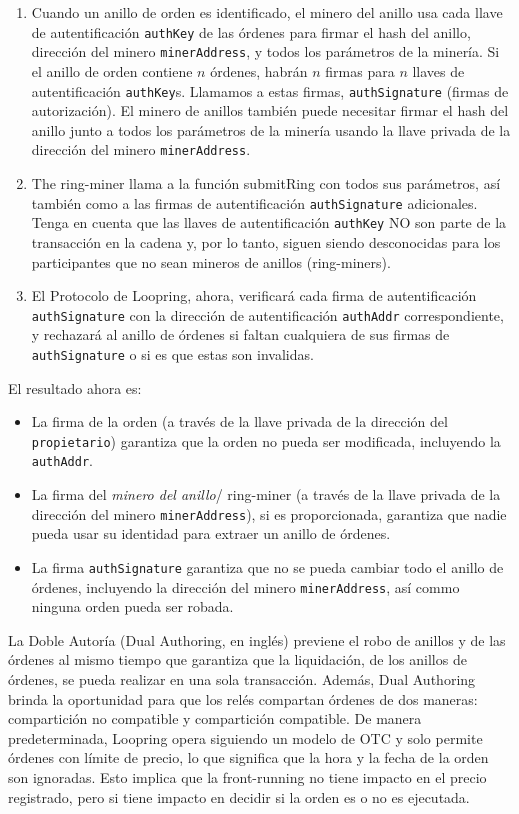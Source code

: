 \documentclass[UTF8,nofonts]{article}
\begin{document}
\begin{multicols}{2}
\begin{enumerate}
	\item Cuando un anillo de orden es identificado, el minero del anillo usa cada llave de autentificaci\'on \verb|authKey| de las \'ordenes para firmar el hash del anillo, direcci\'on del minero \verb|minerAddress|, y todos los par\'ametros de la miner\'ia. Si el anillo de orden contiene $n$ \'ordenes, habr\'an $n$ firmas para $n$ llaves de autentificaci\'on \verb|authKey|s. Llamamos a estas firmas, \verb|authSignature| (firmas de autorizaci\'on). El minero de anillos tambi\'en puede necesitar firmar el hash del anillo junto a todos los par\'ametros de la miner\'ia usando la llave privada de la direcci\'on del minero  \verb|minerAddress|.
	\item The ring-miner llama a la funci\'on submitRing con todos sus par\'ametros, as\'i tambi\'en como a las firmas de autentificaci\'on \verb|authSignature| adicionales. Tenga en cuenta que las llaves de autentificaci\'on \verb|authKey| NO son parte de la transacci\'on en la cadena y, por lo tanto, siguen siendo desconocidas para los participantes que no sean mineros de anillos (ring-miners).

	\item El Protocolo de Loopring, ahora, verificar\'a cada firma de autentificaci\'on \verb|authSignature| con la direcci\'on de autentificaci\'on \verb|authAddr| correspondiente, y rechazar\'a al anillo de \'ordenes si faltan cualquiera de sus firmas de \verb|authSignature| o si es que estas son invalidas.
 
\end{enumerate}
El resultado ahora es:
\begin{itemize}
    \item La firma de la orden (a trav\'es de la llave privada de la direcci\'on del \verb|propietario|) garantiza que la orden no pueda ser modificada, incluyendo la \verb|authAddr|.
    \item La firma del \textit{minero del anillo}/ ring-miner (a trav\'es de la llave privada de la direcci\'on del minero \verb|minerAddress|), si es proporcionada, garantiza que nadie pueda usar su identidad para extraer un anillo de \'ordenes.
    \item  La firma \verb|authSignature| garantiza que no se pueda cambiar todo el anillo de \'ordenes, incluyendo la direcci\'on del minero \verb|minerAddress|, as\'i commo ninguna orden pueda ser robada.
\end{itemize}


La Doble Autor\'ia (Dual Authoring, en ingl\'es) previene el robo de anillos y de las \'ordenes al mismo tiempo que garantiza que la liquidaci\'on, de los anillos de \'ordenes, se pueda realizar en una sola transacci\'on. Adem\'as, Dual Authoring brinda la oportunidad para que los rel\'es compartan \'ordenes de dos maneras: compartici\'on no compatible y compartici\'on compatible. De manera predeterminada, Loopring opera siguiendo un modelo de OTC y solo permite \'ordenes con l\'imite de precio, lo que significa que la hora y la fecha de la orden son ignoradas.
Esto implica que la front-running no tiene impacto en el precio registrado, pero si tiene impacto en decidir si la orden es o no es ejecutada.



\end{multicols}
\end{document}
